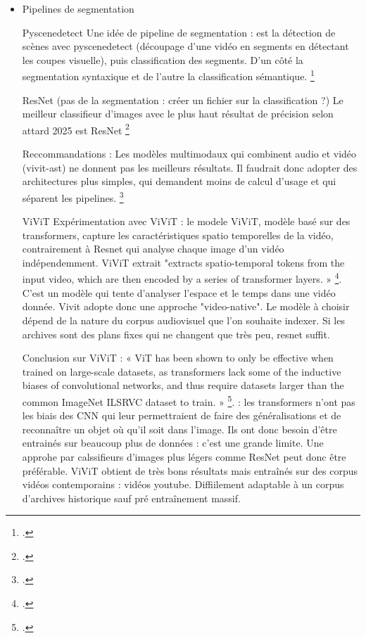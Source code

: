 \begin{itemize}
Importance de la segmentation sémantique pour les vidéos : "videos contain not only spatial features but also temporal features. This naturally results in lower accuracy of image-based segmentation models compared with video-based segmentation models for Video Semantic Segmentation (VSS)." \footcite{yuan2025}

\item Pipelines de segmentation 

\subitem Pyscenedetect 
Une idée de pipeline de segmentation : est la détection de scènes avec pyscenedetect (découpage d'une vidéo en segments en détectant les coupes visuelle), puis classification des segments. D'un côté la segmentation syntaxique et de l'autre la classification sémantique. \footcite{attard2025}

\subitem ResNet (pas de la segmentation : créer un fichier sur la classification ?)
Le meilleur classifieur d'images avec le plus haut résultat de précision selon attard 2025 est ResNet
\footcite{attard2025}

Reccommandations : 
Les modèles multimodaux qui combinent audio et vidéo (vivit-ast) ne donnent pas les meilleurs résultats. Il faudrait donc adopter des architectures plus simples, qui demandent moins de calcul d'usage et qui séparent les pipelines. \footcite{attard2025}

\subitem ViViT
Expérimentation avec ViViT : 
le modele ViViT, modèle basé sur des transformers, capture les caractéristiques spatio temporelles de la vidéo, contrairement à Resnet qui analyse chaque image d'un vidéo indépendemment. ViViT extrait "extracts spatio-temporal tokens from the input video, which are then encoded by a series of transformer layers. » \footcite{arnab2021}. C'est un modèle qui tente d'analyser l'espace et le temps dans une vidéo donnée. Vivit adopte donc une approche "video-native". 
Le modèle à choisir dépend de la nature du corpus audiovisuel que l'on souhaite indexer. Si les archives sont des plans fixes qui ne changent que très peu, resnet suffit. 

Conclusion sur ViViT : 
« ViT has been shown to only be effective when trained on large-scale datasets, as transformers lack some of the inductive biases of convolutional networks, and thus require datasets larger than the common ImageNet ILSRVC dataset to train. » \footcite{arnab2021}. : les transformers n'ont pas les biais des CNN qui leur permettraient de faire des généralisations et de reconnaître un objet où qu'il soit dans l'image. Ils ont donc besoin d'être entrainés sur beaucoup plus de données : c'est une grande limite. Une approhe par calssifieurs d'images plus légers comme ResNet peut donc être préférable. ViViT obtient de très bons résultats mais entraînés sur des corpus vidéos contemporains : vidéos youtube. Diffiilement adaptable à un corpus d'archives historique sauf pré entraînement massif. 


\end{itemize}

